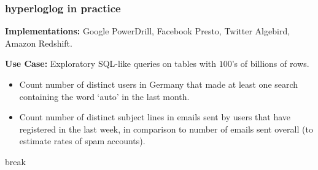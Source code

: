 \documentclass[handout,compress]{beamer}
\begin{document}
\begin{frame}
	\frametitle{hyperloglog in practice}
	\small
	\textbf{Implementations:} Google PowerDrill, Facebook Presto, Twitter Algebird, Amazon Redshift.
	
	\textbf{Use Case:} Exploratory SQL-like queries on tables with $100$'s of billions of rows.
	\begin{itemize}
		\item \alert{Count} number of \alert{distinct} users in Germany that  made at least one search containing the word `auto' in the last month.
		\item \alert{Count} number of \alert{distinct} subject lines in emails sent by users that have registered in the last week, in comparison to number of emails sent overall (to estimate rates of spam accounts).
	\end{itemize}
\end{frame}

%	

\begin{frame}[standout]
	\begin{center}
		break
	\end{center}
\end{frame}
\end{document}
